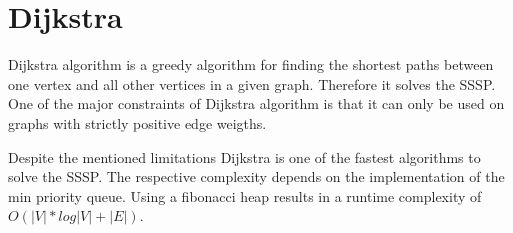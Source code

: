 \chapter{Dijkstra}
Dijkstra algorithm is a greedy algorithm for finding the shortest paths between one vertex and all other vertices in a given graph.
Therefore it solves the \ac{SSSP}. One of the major constraints of Dijkstra algorithm is that it can only be used on graphs
with strictly positive edge weigths. \cite{Tamimi.2015}

Despite the mentioned limitations Dijkstra is one of the fastest algorithms to solve the \ac{SSSP}. The respective complexity depends on the implementation of the min priority queue. Using a fibonacci heap results in a runtime complexity of $O(|V|*log|V| + |E|)$. \cite{Kiruthika.2012}